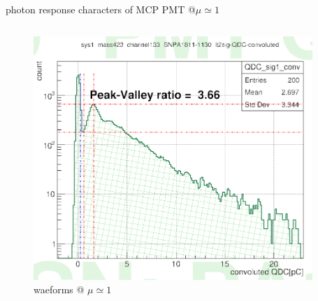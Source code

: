 \documentclass[11pt,compress,xcolor=x11names,UTF8]{beamer}
\begin{document}
\begin{frame}{photon response characters of MCP PMT @$\mu\simeq 1$ }
\begin{columns}
\begin{column}{.475\textwidth}
\begin{figure}
\includegraphics[width=0.94\textwidth]{figure/onepeqdc.png} %
\caption{waeforms @ $\mu\simeq  1$}
\end{figure}
\end{column}
\end{columns}
\end{frame}
\end{document}
